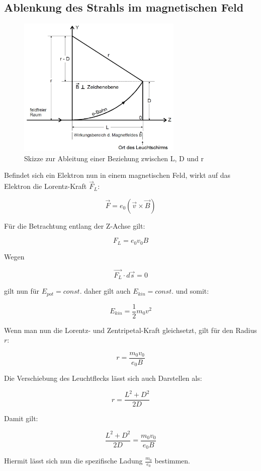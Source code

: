 \subsection{Ablenkung des Strahls im magnetischen Feld}
\begin{figure}[h]
  \centering
  \includegraphics[width=0.7\textwidth]{Grafiken/V501(2)_Abb2.jpg}
  \caption{Skizze zur Ableitung einer Beziehung zwischen L, D und r \cite{V502}}
\end{figure}
Befindet sich ein Elektron nun in einem magnetischen Feld, wirkt auf das Elektron die Lorentz-Kraft $\vec{F}_L$:

\begin{equation}
  \vec{F} = e_0 (\vec{v} \times \vec{B})
\end{equation}

Für die Betrachtung entlang der Z-Achse gilt:

\begin{equation}
  F_L = e_0 v_0 B
\end{equation}

Wegen 

\begin{equation}
  \vec{F_L}\cdot d\vec{s} = 0
\end{equation}

gilt nun für $E_{pot} = const.$ daher gilt auch $E_{kin} = const.$
und somit:

\begin{equation}
  E_{kin} = \frac{1}{2} m_0 v^2
\end{equation}

Wenn man nun die Lorentz- und Zentripetal-Kraft gleichsetzt, gilt für den Radius $r$:

\begin{equation}
  r = \frac{m_0v_0}{e_0B}
\end{equation}

Die Verschiebung des Leuchtflecks lässt sich auch Darstellen als:

\begin{equation}
  r = \frac{L^2 + D^2}{2D}
\end{equation}

Damit gilt:

\begin{equation}
  \label{eq:Theorie_Qspez}
  \frac{L^2 + D^2}{2D} = \frac{m_0v_0}{e_0B}
\end{equation}

Hiermit lässt sich nun die spezifische Ladung $\frac{m_0}{e_0}$ bestimmen.
